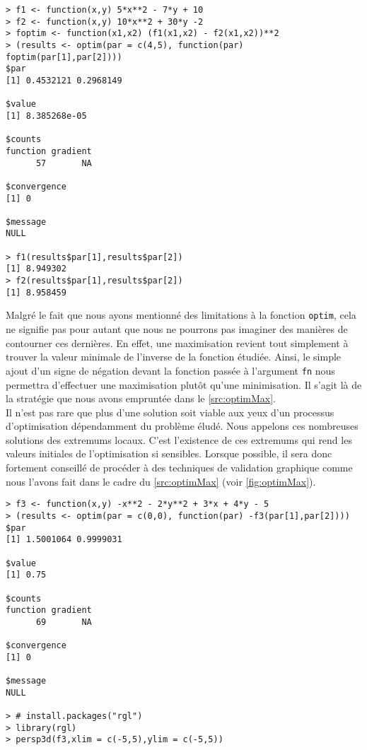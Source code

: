 \begin{lstlisting}[caption = Optimisation générique avec R,label=src:optim]
> f1 <- function(x,y) 5*x**2 - 7*y + 10
> f2 <- function(x,y) 10*x**2 + 30*y -2
> foptim <- function(x1,x2) (f1(x1,x2) - f2(x1,x2))**2
> (results <- optim(par = c(4,5), function(par) foptim(par[1],par[2])))
$par
[1] 0.4532121 0.2968149

$value
[1] 8.385268e-05

$counts
function gradient 
      57       NA 

$convergence
[1] 0

$message
NULL

> f1(results$par[1],results$par[2])
[1] 8.949302
> f2(results$par[1],results$par[2])
[1] 8.958459
\end{lstlisting}

\vspace{\baselineskip}
Malgré le fait que nous ayons mentionné des limitations à la fonction \texttt{optim}, cela ne signifie pas pour autant que nous ne pourrons pas imaginer des manières de contourner ces dernières. En effet, une maximisation revient tout simplement à trouver la valeur minimale de l'inverse de la fonction étudiée. Ainsi, le simple ajout d'un signe de négation devant la fonction passée à l'argument \texttt{fn} nous permettra d'effectuer une maximisation plutôt qu'une minimisation. Il s'agit là de la stratégie que nous avons empruntée dans le \autoref{src:optimMax}. \\

Il n’est pas rare que plus d’une solution soit viable aux yeux d’un processus d’optimisation dépendamment du problème éludé. Nous appelons ces nombreuses solutions des extremums locaux. C'est l'existence de ces extremums qui rend les valeurs initiales de l'optimisation si sensibles. Lorsque possible, il sera donc fortement conseillé de procéder à des techniques de validation graphique comme nous l'avons fait dans le cadre du \autoref{src:optimMax} (voir \autoref{fig:optimMax}). \\

\begin{lstlisting}[caption = Maximisation d'une fonction avec \texttt{optim},label=src:optimMax]
> f3 <- function(x,y) -x**2 - 2*y**2 + 3*x + 4*y - 5
> (results <- optim(par = c(0,0), function(par) -f3(par[1],par[2])))
$par
[1] 1.5001064 0.9999031

$value
[1] 0.75

$counts
function gradient 
      69       NA 

$convergence
[1] 0

$message
NULL

> # install.packages("rgl")
> library(rgl)
> persp3d(f3,xlim = c(-5,5),ylim = c(-5,5))
\end{lstlisting}

